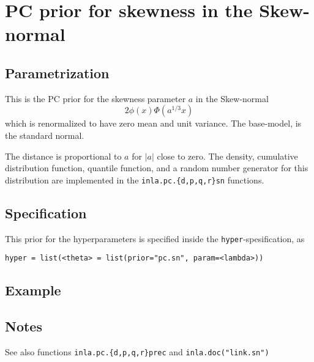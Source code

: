 \documentclass[a4paper,11pt]{article}
\begin{document}
\section*{PC prior for skewness in the Skew-normal}

\subsection*{Parametrization}
This is the PC prior for the skewness parameter $a$ in the Skew-normal 
\begin{displaymath}
    2\phi(x)\Phi(a^{1/3}x)
\end{displaymath}
which is renormalized to have zero mean and unit variance. The
base-model, is the standard normal. 

The distance is proportional to $a$ for $|a|$ close to zero. The
density, cumulative distribution function, quantile function, and a
random number generator for this distribution are implemented in the
\texttt{inla.pc.\{d,p,q,r\}sn} functions.

\subsection*{Specification}
This prior for the hyperparameters is specified inside the
\texttt{hyper}-spesification, as
\begin{center}
    \texttt{hyper = list(<theta> =
        list(prior="pc.sn", param=<lambda>))}
\end{center}

\subsection*{Example}

\subsection*{Notes}

See also functions \texttt{inla.pc.\{d,p,q,r\}prec} and
\texttt{inla.doc("link.sn")}
\end{document}
